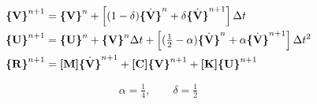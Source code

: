 \begin{align}
    \Cme{V}^{n+1} & = \Cme{V}^n + \left[ (1-\delta) \dot{\Cme{V}}^n + \delta\dot{\Cme{V}}^{n+1} \right] \Delta t \\
    \Cme{U}^{n+1} & = \Cme{U}^{n} + \Cme{V}^{n}\Delta t +\left[ (\tfrac{1}{2} - \alpha)\dot{\Cme{V}}^n + \alpha \dot{\Cme{V}}^{n+1} \right] \Delta t ^2 \\
    \Cme{R}^{n+1} & = \Mme{M} \dot{\Cme{V}}^{n+1} + \Mme{C} \Cme{V}^{n+1} + \Mme{K} \Cme{U}^{n+1}
\end{align}

\begin{equation} \label{eq:constantaccelNewmark}
\alpha = \tfrac{1}{4}, \qquad \delta = \tfrac{1}{2}
\end{equation}

